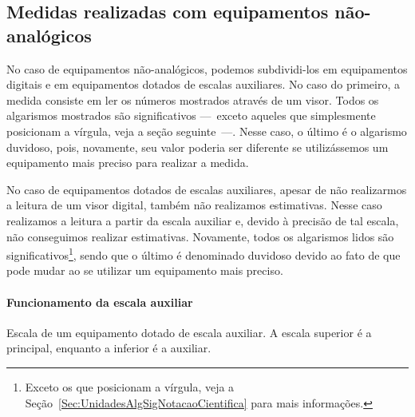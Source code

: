 \subsection{Medidas realizadas com equipamentos não-analógicos}

No caso de equipamentos não-analógicos, podemos subdividi-los em equipamentos digitais e em equipamentos dotados de escalas auxiliares. No caso do primeiro, a medida consiste em ler os números mostrados através de um visor. Todos os algarismos mostrados são significativos ---~exceto aqueles que simplesmente posicionam a vírgula, veja a seção seguinte~---. Nesse caso, o último é o algarismo duvidoso, pois, novamente, seu valor poderia ser diferente se utilizássemos um equipamento mais preciso para realizar a medida.

No caso de equipamentos dotados de escalas auxiliares, apesar de não realizarmos a leitura de um visor digital, também não realizamos estimativas. Nesse caso realizamos a leitura a partir da escala auxiliar e, devido à precisão de tal escala, não conseguimos realizar estimativas. Novamente, todos os algarismos lidos são significativos\footnote{Exceto os que posicionam a vírgula, veja a Seção~\ref{Sec:UnidadesAlgSigNotacaoCientifica} para mais informações.}, sendo que o último é denominado duvidoso devido ao fato de que pode mudar ao se utilizar um equipamento mais preciso.

\paragraph{Funcionamento da escala auxiliar}

\begin{marginfigure}[2 cm]
\centering
{}
\caption{Escala de um equipamento dotado de escala auxiliar. A escala superior é a principal, enquanto a inferior é a auxiliar.\label{Fig:NonioFechado}}
\end{marginfigure}


